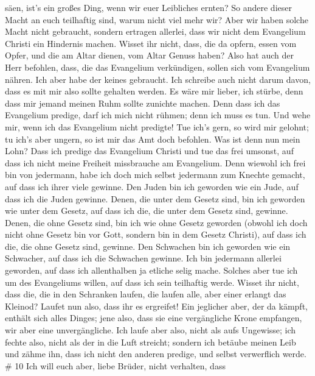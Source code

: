 säen, ist's ein großes Ding, wenn wir euer Leibliches ernten?
 So andere dieser Macht an euch teilhaftig sind, warum
nicht viel mehr wir? Aber wir haben solche Macht nicht gebraucht,
sondern ertragen allerlei, dass wir nicht dem Evangelium Christi ein
Hindernis machen.  Wisset ihr nicht, dass, die da opfern,
essen vom Opfer, und die am Altar dienen, vom Altar Genuss haben?
 Also hat auch der Herr befohlen, dass, die das Evangelium
verkündigen, sollen sich vom Evangelium nähren.  Ich aber
habe der keines gebraucht. Ich schreibe auch nicht darum davon, dass es
mit mir also sollte gehalten werden. Es wäre mir lieber, ich stürbe,
denn dass mir jemand meinen Ruhm sollte zunichte machen. 
Denn dass ich das Evangelium predige, darf ich mich nicht rühmen; denn
ich muss es tun. Und wehe mir, wenn ich das Evangelium nicht predigte!
 Tue ich's gern, so wird mir gelohnt; tu ich's aber ungern,
so ist mir das Amt doch befohlen.  Was ist denn nun mein
Lohn? Dass ich predige das Evangelium Christi und tue das frei umsonst,
auf dass ich nicht meine Freiheit missbrauche am Evangelium.
 Denn wiewohl ich frei bin von jedermann, habe ich doch
mich selbst jedermann zum Knechte gemacht, auf dass ich ihrer viele
gewinne.  Den Juden bin ich geworden wie ein Jude, auf dass
ich die Juden gewinne. Denen, die unter dem Gesetz sind, bin ich
geworden wie unter dem Gesetz, auf dass ich die, die unter dem Gesetz
sind, gewinne.  Denen, die ohne Gesetz sind, bin ich wie
ohne Gesetz geworden (obwohl ich doch nicht ohne Gesetz bin vor Gott,
sondern bin in dem Gesetz Christi), auf dass ich die, die ohne Gesetz
sind, gewinne.  Den Schwachen bin ich geworden wie ein
Schwacher, auf dass ich die Schwachen gewinne. Ich bin jedermann
allerlei geworden, auf dass ich allenthalben ja etliche selig mache.
 Solches aber tue ich um des Evangeliums willen, auf dass
ich sein teilhaftig werde.  Wisset ihr nicht, dass die, die
in den Schranken laufen, die laufen alle, aber einer erlangt das
Kleinod? Laufet nun also, dass ihr es ergreifet!  Ein
jeglicher aber, der da kämpft, enthält sich alles Dinges; jene also,
dass sie eine vergängliche Krone empfangen, wir aber eine
unvergängliche.  Ich laufe aber also, nicht als aufs
Ungewisse; ich fechte also, nicht als der in die Luft streicht;
 sondern ich betäube meinen Leib und zähme ihn, dass ich
nicht den anderen predige, und selbst verwerflich werde. \# 10
 Ich will euch aber, liebe Brüder, nicht verhalten, dass
